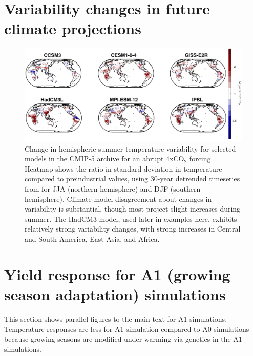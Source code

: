 \documentclass[12pt]{article}
\begin{document}
{{\clearpage
\section{Variability changes in future climate projections}
\begin{figure}[h!]
  \centering
  \includegraphics[width = 16.3cm]{tas_Amon_LRM6_abrupt4x_control_LF_maps_JJA_final.png}
  \caption{
	  Change in hemispheric-summer temperature variability for selected models in the CMIP-5 archive for an abrupt 4xCO$_2$ forcing. Heatmap shows the ratio in standard deviation in temperature compared to preindustrial values, using 30-year detrended timeseries from for JJA (northern hemisphere) and DJF (southern hemisphere).  %
   Climate model disagreement about changes in variability is substantial, though most project slight increases during summer. The HadCM3 model, used later in examples here, exhibits relatively strong variability changes, with strong increases in Central and South America, East Asia, and Africa.
  }
  \label{fig:lpjmlrcp}
\end{figure}

\clearpage
\section{Yield response for A1 (growing season adaptation) simulations}
This section shows parallel figures to the main text for A1 simulations. Temperature responses are less for A1 simulation compared to A0 simulations because growing seasons are modified under warming via genetics in the A1 simulations.

}}
\end{document}
